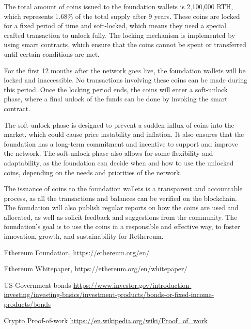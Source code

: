 \documentclass[a4paper,onecolumn, superscriptaddress,10pt,accepted=2020-05-01,issue=1, volume=2, shorttitle=papers]{compositionalityarticle}
\begin{document}
\vspace{0.3cm}

The total amount of coins issued to the foundation wallets is 2,100,000 RTH, which represents 1.68\% of the total supply after 9 years. These coins are locked for a fixed period of time and soft-locked, which means they need a special crafted transaction to unlock fully. The locking mechanism is implemented by using smart contracts, which ensure that the coins cannot be spent or transferred until certain conditions are met.

\vspace{0.3cm}

For the first 12 months after the network goes live, the foundation wallets will be locked and inaccessible. No transactions involving these coins can be made during this period. Once the locking period ends, the coins will enter a soft-unlock phase, where a final unlock of the funds can be done by invoking the smart contract.


\vspace{0.3cm}

The soft-unlock phase is designed to prevent a sudden influx of coins into the market, which could cause price instability and inflation. It also ensures that the foundation has a long-term commitment and incentive to support and improve the network. The soft-unlock phase also allows for some flexibility and adaptability, as the foundation can decide when and how to use the unlocked coins, depending on the needs and priorities of the network.

\vspace{0.3cm}

The issuance of coins to the foundation wallets is a transparent and accountable process, as all the transactions and balances can be verified on the blockchain. The foundation will also publish regular reports on how the coins are used and allocated, as well as solicit feedback and suggestions from the community. The foundation’s goal is to use the coins in a responsible and effective way, to foster innovation, growth, and sustainability for Rethereum.



\newpage


\begin{thebibliography}{9}
  Ethereum Foundation,
  \href{https://ethereum.org/en/}{https://ethereum.org/en/}

  Ethereum Whitepaper,
  \href{https://ethereum.org/en/whitepaper/}{https://ethereum.org/en/whitepaper/}

  US Government bonds 
  \href{https://www.investor.gov/introduction-investing/investing-basics/investment-products/bonds-or-fixed-income-products/bonds}{https://www.investor.gov/introduction-investing/investing-basics/investment-products/bonds-or-fixed-income-products/bonds}

  Crypto Proof-of-work 
  \href{https://en.wikipedia.org/wiki/Proof_of_work}{https://en.wikipedia.org/wiki/Proof_of_work}


\end{thebibliography}



\onecolumn\newpage
\end{document}
